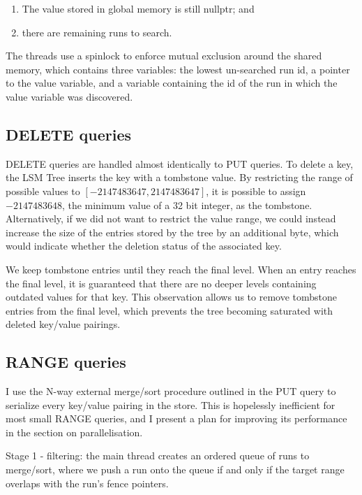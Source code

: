 \documentclass{acm}
\begin{document}
\begin{enumerate} 
  \item The value stored in global memory is still nullptr; and
  \item there are remaining runs to search. 
\end{enumerate}

The threads use a spinlock to enforce mutual exclusion around the shared memory, which contains three variables: the lowest un-searched run id, a pointer to the value variable, and a variable containing the id of the run in which the value variable was discovered.

\subsection{DELETE queries}

DELETE queries are handled almost identically to PUT queries. To delete a key, the LSM Tree inserts the key with a tombstone value. By restricting the range of possible values to $[-2147483647, 2147483647]$, it is possible to assign $-2147483648$, the minimum value of a 32 bit integer, as the tombstone. Alternatively, if we did not want to restrict the value range, we could instead increase the size of the entries stored by the tree by an additional byte, which would indicate whether the deletion status of the associated key.

We keep tombstone entries until they reach the final level. When an entry reaches the final level, it is guaranteed that there are no deeper levels containing outdated values for that key. This observation allows us to remove tombstone entries from the final level, which prevents the tree becoming saturated with deleted key/value pairings.

\subsection{RANGE queries}

I use the N-way external merge/sort procedure outlined in the PUT query to serialize every key/value pairing in the store. This is hopelessly inefficient for most small RANGE queries, and I present a plan for improving its performance in the section on parallelisation.

Stage 1 - filtering: the main thread creates an ordered queue of runs to merge/sort, where we push a run onto the queue if and only if the target range overlaps with the run's fence pointers.
\end{document}
